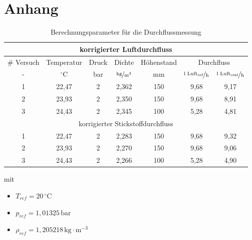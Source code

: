 \documentclass[12pt,liststotoc]{report}
\begin{document}
\newpage

% 
%


\printbibliography
{} 
\chapter*{Anhang}

\begin{table}[H]
\caption{Berechnungsparameter für die Durchflussmessung}
\centering
\begin{tabular}{ccccccc}
\toprule\toprule
\multicolumn{7}{c}{korrigierter Luftdurchfluss}\\
\midrule \midrule
\# Versuch&Temperatur&Druck&Dichte\cite{Peacesofware} &Höhenstand&\multicolumn{2}{c}{Durchfluss}\\
-&$^\circ\text{C}$&bar&$\nicefrac{\text{kg}}{\text{m}^3}$&mm&$\nicefrac{\text{l Luft}_{\text{ref}}}{\text{h}}$&$\nicefrac{\text{l Luft}_{\text{real}}}{\text{h}}$\\
\midrule
1&22,47&2&2,362&150&9,68&9,17\\
2&23,93&2&2,350&150&9,68&8,91\\
3&24,43&2&2,345&100&5,28&4,81\\
\midrule\midrule
\multicolumn{7}{c}{korrigierter Stickstoffdurchfluss}\\
\midrule \midrule
1&22,47&2&2,283&150&9,68&9,32\\
2&23,93&2&2,270&150&9,68&9,06\\
3&24,43&2&2,266&100&5,28&4,90\\
\bottomrule
\end{tabular}
\label{Parameter_Anhang}
\end{table}
\noindent
mit 
\begin{itemize}
    \item $T_{ref} = 20\,^\circ\text{C}$
    \item $p_{ref} = 1,01325\,\text{bar}$
    \item $\rho_{ref} = 1,205218\,\text{kg}\cdot\text{m}^{-3}$
\end{itemize}
\end{document}

